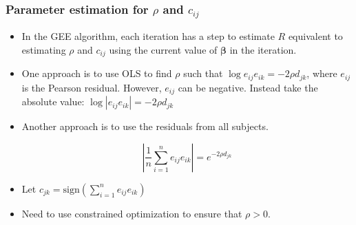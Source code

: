 \documentclass{beamer}
\begin{document}
\begin{frame}
\frametitle{Parameter estimation for $\rho$ and $c_{ij}$}
\begin{itemize}
  \item In the GEE algorithm, each iteration has a step to estimate $R$ equivalent to estimating $\rho$ and $c_{ij}$ using the current value of $\boldsymbol\beta$ in the iteration.

  \item One approach is to use OLS to find $\rho$ such that $\log e_{ij}e_{ik} = -2\rho d_{jk}$, where $e_{ij}$ is the Pearson residual. However, $e_{ij}$ can be negative. Instead take the absolute value: $\log |e_{ij}e_{ik}| = -2\rho d_{jk}$

  \item Another approach is to use the residuals from all subjects.

  $$\left| \frac{1}{n} \sum_{i=1}^{n} e_{ij}e_{ik} \right| = e^{-2\rho d_{jk}}$$

  \item Let $c_{jk} = \text{sign}\left(\sum_{i=1}^n e_{ij}e_{ik}\right)$

  \item Need to use constrained optimization to ensure that $\rho > 0$.

\end{itemize}

\end{frame}
\end{document}
